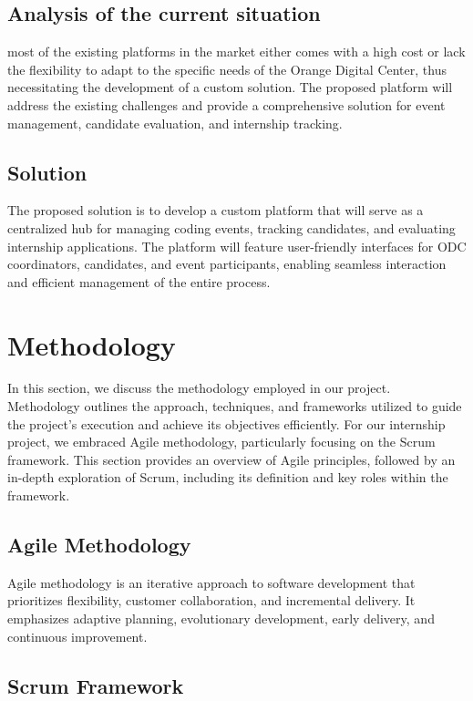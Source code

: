 \subsection{Analysis of the current situation}
most of the existing platforms in the market either comes with a high cost or
lack the flexibility to adapt to the specific needs of the Orange Digital
Center, thus
necessitating the development of a custom solution. The proposed platform will
address the existing challenges and provide a comprehensive solution for event
management, candidate evaluation, and internship tracking.

\subsection{Solution}
The proposed solution is to develop a custom platform that will serve as a
centralized hub for managing coding events, tracking candidates, and evaluating
internship applications. The platform will feature user-friendly interfaces for
ODC coordinators, candidates, and event participants, enabling seamless
interaction and efficient management of the entire process.

\section{Methodology}
In this section, we discuss the methodology employed in our project.
Methodology outlines the approach, techniques, and frameworks utilized to guide
the project's execution and achieve its objectives efficiently. For our
internship project, we embraced Agile methodology, particularly focusing on the
Scrum framework. This section provides an overview of Agile principles,
followed by an in-depth exploration of Scrum, including its definition and key
roles within the framework.

\subsection{Agile Methodology}

Agile methodology is an iterative approach to software development that
prioritizes flexibility, customer collaboration, and incremental delivery. It
emphasizes adaptive planning, evolutionary development, early delivery, and
continuous improvement.

\subsection{Scrum Framework}

